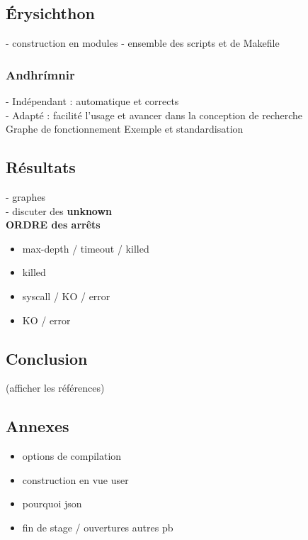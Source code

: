 \documentclass[10pt,a5paper]{article}
\begin{document}
\subsection*{Érysichthon}

- construction en modules
- ensemble des scripts et de Makefile

\subsubsection*{Andhrímnir}
- Indépendant : automatique et corrects\\
- Adapté : facilité l'usage et avancer dans la conception de recherche\\
\smallbreak
Graphe de fonctionnement
\smallbreak
Exemple et standardisation
\newpage
\subsection*{Résultats}
- graphes\\
- discuter des \textbf{unknown}\\
\hspace{5pt}\textbf{ORDRE des arrêts}
  \begin{itemize}
    \item max-depth / timeout / killed
    \item killed
    \item syscall / KO / error
    \item KO / error
  \end{itemize}



\subsection*{Conclusion}
(afficher les références)



\subsection*{Annexes}

\begin{itemize}
  \item options de compilation
  \item construction en vue user
  \item pourquoi json
  \item fin de stage / ouvertures autres pb
\end{itemize}
\end{document}
